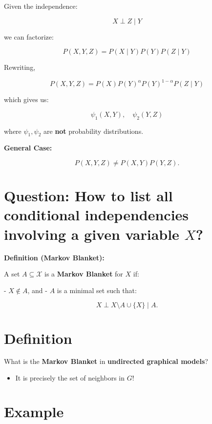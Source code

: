\documentclass{article}%
\begin{document}
Given the independence:

\[
X \perp Z \mid Y
\]

we can factorize:

\[
P(X, Y, Z) = P(X \mid Y) P(Y) P(Z \mid Y)
\]

Rewriting,

\[
P(X, Y, Z) = P(X) P(Y)^\alpha P(Y)^{1-\alpha} P(Z \mid Y)
\]

which gives us:

\[
\psi_1 (X,Y), \quad \psi_2 (Y,Z)
\]

where \( \psi_1, \psi_2 \) are \textbf{not} probability distributions.

\textbf{General Case:} 

\[
P(X, Y, Z) \neq P(X, Y) P(Y, Z).
\]

\section*{Question: How to list all conditional independencies involving a given variable \( X \)?}

\textbf{Definition (Markov Blanket):} 

A set \( A \subseteq \mathcal{X} \) is a \textbf{Markov Blanket} for \( X \) if:

- \( X \not\in A \), and 
- \( A \) is a minimal set such that:

\[
X \perp X \setminus A \cup \{X\} \mid A.
\]


\section*{Definition}

What is the \textbf{Markov Blanket} in \textbf{undirected graphical models}?

\begin{itemize}
    \item It is precisely the set of neighbors in \( G \)!
\end{itemize}

\section*{Example}

\begin{center}
\end{center}
\end{document}
